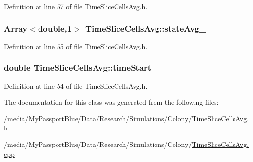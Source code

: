 \-Definition at line 57 of file \-Time\-Slice\-Cells\-Avg.\-h.

\hypertarget{class_time_slice_cells_avg_aac43db30ea3a41ee3ed291a557a73a25}{
\subsubsection[{state\-Avg\-\_\-}]{\setlength{\rightskip}{0pt plus 5cm}\-Array$<$double,1$>$ {\bf \-Time\-Slice\-Cells\-Avg\-::state\-Avg\-\_\-}}}\label{class_time_slice_cells_avg_aac43db30ea3a41ee3ed291a557a73a25}


\-Definition at line 55 of file \-Time\-Slice\-Cells\-Avg.\-h.

\hypertarget{class_time_slice_cells_avg_a26cd7ddaee9fd247af1b03c019efdc27}{
\subsubsection[{time\-Start\-\_\-}]{\setlength{\rightskip}{0pt plus 5cm}double {\bf \-Time\-Slice\-Cells\-Avg\-::time\-Start\-\_\-}}}\label{class_time_slice_cells_avg_a26cd7ddaee9fd247af1b03c019efdc27}


\-Definition at line 54 of file \-Time\-Slice\-Cells\-Avg.\-h.



\-The documentation for this class was generated from the following files\-:\begin{DoxyCompactItemize}
\item 
/media/\-My\-Passport\-Blue/\-Data/\-Research/\-Simulations/\-Colony/\hyperlink{_time_slice_cells_avg_8h}{\-Time\-Slice\-Cells\-Avg.\-h}\item 
/media/\-My\-Passport\-Blue/\-Data/\-Research/\-Simulations/\-Colony/\hyperlink{_time_slice_cells_avg_8cpp}{\-Time\-Slice\-Cells\-Avg.\-cpp}\end{DoxyCompactItemize}
